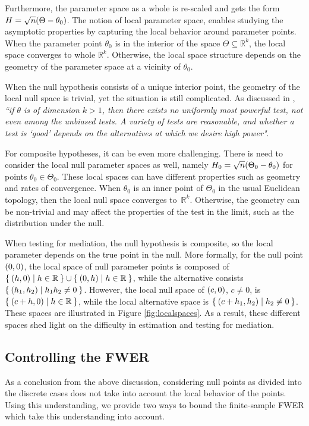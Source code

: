 \documentclass[ejs, twoside]{imsart}
\theoremstyle{plain}
\theoremstyle{remark}
\newcommand{\real}{\mathbb{R}}
\numberwithin{equation}{section}
\numberwithin{table}{section}
\numberwithin{figure}{section}
\let\originalleft\left
\let\originalright\right
\renewcommand{\left}{\mathopen{}\mathclose\bgroup\originalleft}
\renewcommand{\right}{\aftergroup\egroup\originalright}
\begin{document}
Furthermore, the parameter space as a whole is re-scaled and gets the form \(H = \sqrt{n}\left(\Theta - \theta_0 \right) \). The notion of local parameter space, enables studying the asymptotic properties by capturing the local behavior around parameter points. When the parameter point \(\theta_0\) is in the interior of the space \(\Theta \subseteq \real^k\), the local space converges to whole \(\real^k\). Otherwise, the local space structure depends on the geometry of the parameter space at a vicinity of \(\theta_0\). 

When the null hypothesis consists of a unique interior point, the geometry of the local null space is trivial, yet the situation is still complicated. As discussed in \citet[p.~217]{van_der_vaart_asymptotic_1998}, \textit{``if \(\theta\) is of dimension \(k>1\), then there exists no uniformly most powerful test, not even among the unbiased tests. A variety of tests are reasonable, and whether a test is `good' depends on the alternatives at which we desire high power"}.


For composite hypotheses, it can be even more challenging.
There is need to consider the local null parameter spaces as well, namely \(H_0 = \sqrt{n}\left(\Theta_0 - \theta_0 \right) \) for points \(\theta_0 \in \Theta_0\). These local spaces can have different properties such as geometry and rates of convergence. When \(\theta_0\) is an inner point of \(\Theta_0\) in the usual Euclidean topology, then the local null space converges to~\(\real^k\). Otherwise, the geometry can be non-trivial and may affect the properties of the test in the limit, such as the distribution under the null.


When testing for mediation, the null hypothesis is composite, so the local parameter depends on the true point in the null. More formally, for the null point \(\left( 0,0 \right) \), the local space of null parameter points is composed of \(\Set{\left(h, 0\right) | h \in \real} \cup \Set{\left(0, h\right) | h \in \real}\), while the alternative consists \(\Set{\left(h_1, h_2\right) | h_1 h_2 \neq 0}\).
However, the local null space of \(\left(c, 0 \right) \), \(c\neq 0\), is \(\Set{\left(c + h, 0\right) | h \in \real}\), while the local alternative space is \(\Set{\left(c + h_1, h_2\right) | h_2 \neq 0}\).
These spaces are illustrated in Figure \ref{fig:localspaces}.
As a result, these different spaces shed light on the difficulty in estimation and testing for mediation.


\subsection{Controlling the FWER}
As a conclusion from the above discussion, considering null points as divided into the discrete cases does not take into account the local behavior of the points. Using this understanding, we provide two ways to bound the finite-sample FWER which take this understanding into account.
\end{document}

